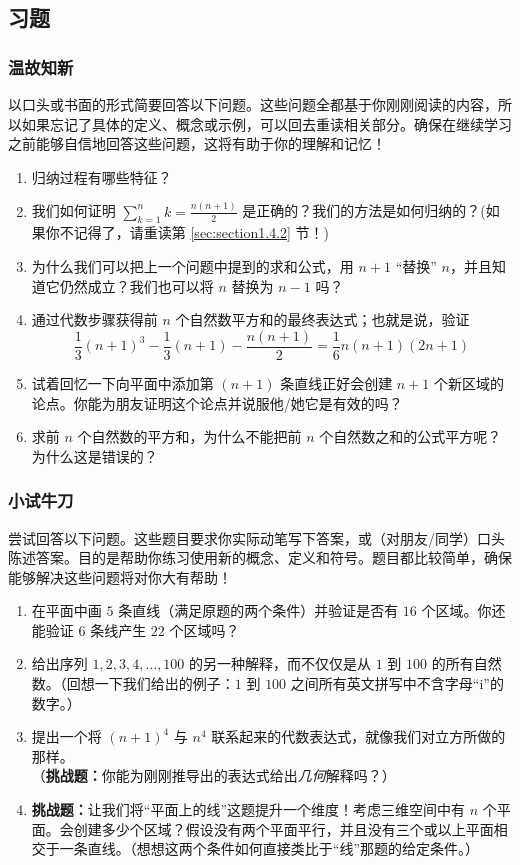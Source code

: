 \subsection{习题}

\subsubsection*{温故知新}

以口头或书面的形式简要回答以下问题。这些问题全都基于你刚刚阅读的内容，所以如果忘记了具体的定义、概念或示例，可以回去重读相关部分。确保在继续学习之前能够自信地回答这些问题，这将有助于你的理解和记忆！

\begin{enumerate}[label=(\arabic*)]
    \item 归纳过程有哪些特征？
    \item 我们如何证明 $\sum_{k=1}^{n}k = \frac{n(n+1)}{2}$ 是正确的？我们的方法是如何归纳的？(如果你不记得了，请重读第 \ref{sec:section1.4.2} 节！)
    \item 为什么我们可以把上一个问题中提到的求和公式，用 $n+1$ ``替换'' $n$，并且知道它仍然成立？我们也可以将 $n$ 替换为 $n - 1$ 吗？
    \item 通过代数步骤获得前 $n$ 个自然数平方和的最终表达式；也就是说，验证
    \[\frac{1}{3}(n+1)^3-\frac{1}{3}(n+1)-\frac{n(n+1)}{2} = \frac{1}{6}n(n+1)(2n+1)\]
    \item 试着回忆一下向平面中添加第 $(n+1)$ 条直线正好会创建 $n+1$ 个新区域的论点。你能为朋友证明这个论点并说服他/她它是有效的吗？
    \item 求前 $n$ 个自然数的平方和，为什么不能把前 $n$ 个自然数之和的公式平方呢？为什么这是错误的？
\end{enumerate}

\subsubsection*{小试牛刀}

尝试回答以下问题。这些题目要求你实际动笔写下答案，或（对朋友/同学）口头陈述答案。目的是帮助你练习使用新的概念、定义和符号。题目都比较简单，确保能够解决这些问题将对你大有帮助！

\begin{enumerate}[label=(\arabic*)]
    \item 在平面中画 $5$ 条直线（满足原题的两个条件）并验证是否有 $16$ 个区域。你还能验证 $6$ 条线产生 $22$ 个区域吗？
    \item 给出序列 $1, 2, 3, 4, \dots , 100$ 的另一种解释，而不仅仅是从 $1$ 到 $100$ 的所有自然数。（回想一下我们给出的例子：$1$ 到 $100$ 之间所有英文拼写中不含字母``i''的数字。）
    \item 提出一个将 $(n + 1)^4$ 与 $n^4$ 联系起来的代数表达式，就像我们对立方所做的那样。\\ 
    （\textbf{挑战题：}你能为刚刚推导出的表达式给出\emph{几何}解释吗？）
    \item \textbf{挑战题：}让我们将``平面上的线''这题提升一个维度！考虑三维空间中有 $n$ 个平面。会创建多少个区域？假设没有两个平面平行，并且没有三个或以上平面相交于一条直线。（想想这两个条件如何直接类比于``线''那题的给定条件。）
\end{enumerate}